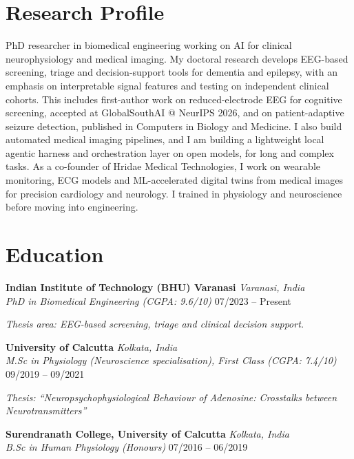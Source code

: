 \documentclass[10pt,a4paper]{article}
\newcommand{\entry}[4]{
  \noindent\textbf{#1} \hfill \textit{#2} \\
  \textit{#3} \hfill #4 \par
  \vspace{3pt}
}
\begin{document}
\section{Research Profile}
\small
PhD researcher in biomedical engineering working on AI for clinical neurophysiology and medical imaging. My doctoral research develops EEG-based screening, triage and decision-support tools for dementia and epilepsy, with an emphasis on interpretable signal features and testing on independent clinical cohorts. This includes first-author work on reduced-electrode EEG for cognitive screening, accepted at GlobalSouthAI @ NeurIPS 2026, and on patient-adaptive seizure detection, published in Computers in Biology and Medicine. I also build automated medical imaging pipelines, and I am building a lightweight local agentic harness and orchestration layer on open models, for long and complex tasks. As a co-founder of Hridae Medical Technologies, I work on wearable monitoring, ECG models and ML-accelerated digital twins from medical images for precision cardiology and neurology. I trained in physiology and neuroscience before moving into engineering.

\vspace{8pt}

\section{Education}
\entry{Indian Institute of Technology (BHU) Varanasi}{Varanasi, India}{PhD in Biomedical Engineering (CGPA: 9.6/10)}{07/2023 -- Present}
\footnotesize \textit{Thesis area: EEG-based screening, triage and clinical decision support.}

\entry{University of Calcutta}{Kolkata, India}{M.Sc in Physiology (Neuroscience specialisation), First Class (CGPA: 7.4/10)}{09/2019 -- 09/2021}
\footnotesize \textit{Thesis: ``Neuropsychophysiological Behaviour of Adenosine: Crosstalks between Neurotransmitters''}

\entry{Surendranath College, University of Calcutta}{Kolkata, India}{B.Sc in Human Physiology (Honours)}{07/2016 -- 06/2019}

\vspace{8pt}

\end{document}

